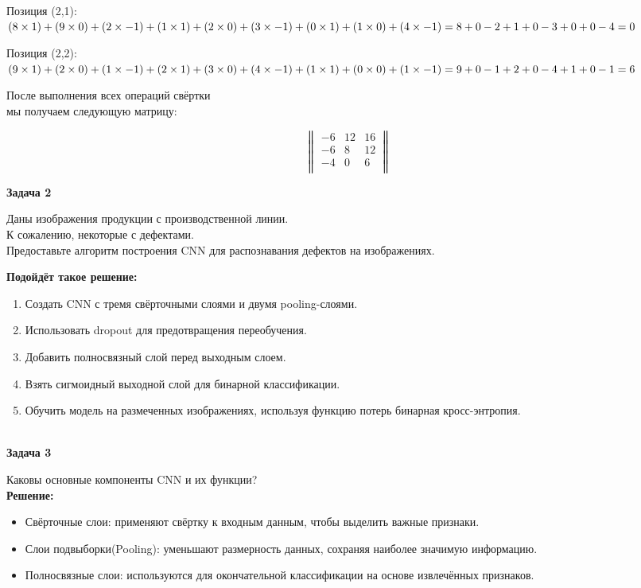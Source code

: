 \begin{description}
Позиция (2,1):
$
(8 \times 1) + (9 \times 0) + (2 \times -1) + \\
(1 \times 1) + (2 \times 0) + (3 \times -1) + \\
(0 \times 1) + (1 \times 0) + (4 \times -1) = \\
8 + 0 - 2 + 1 + 0 - 3 + 0 + 0 - 4 = 0
$

Позиция (2,2):
$
(9 \times 1) + (2 \times 0) + (1 \times -1) + \\
(2 \times 1) + (3 \times 0) + (4 \times -1) + \\
(1 \times 1) + (0 \times 0) + (1 \times -1) = \\
9 + 0 - 1 + 2 + 0 - 4 + 1 + 0 - 1 = 6
$

После выполнения всех операций свёртки\\
мы получаем следующую матрицу:

$$
\begin{Vmatrix}
-6 & 12 & 16 \\
-6 & 8 & 12 \\
-4 & 0 & 6 \\
\end{Vmatrix}
$$

\newpage
\textbf{Задача 2}

Даны изображения продукции с производственной линии.\\
К сожалению, некоторые с дефектами.\\
Предоставьте алгоритм построения CNN для распознавания дефектов на изображениях.

\textbf{Подойдёт такое решение:}

\begin{enumerate}
    \item Создать CNN с тремя свёрточными слоями и двумя pooling-слоями.
    \item Использовать dropout для предотвращения переобучения.
    \item Добавить полносвязный слой перед выходным слоем.
    \item Взять сигмоидный выходной слой для бинарной классификации.
    \item Обучить модель на размеченных изображениях, используя функцию потерь бинарная кросс-энтропия.\end{enumerate}\\

\textbf{Задача 3}

Каковы основные компоненты CNN и их функции?\\
\textbf{Решение:}
\begin{itemize}
    \item Свёрточные слои: применяют свёртку к входным данным, чтобы выделить важные признаки.
    \item Слои подвыборки(Pooling): уменьшают размерность данных, сохраняя наиболее значимую информацию.
    \item Полносвязные слои: используются для окончательной классификации на основе извлечённых признаков.
\end{itemize}

\end{description}


